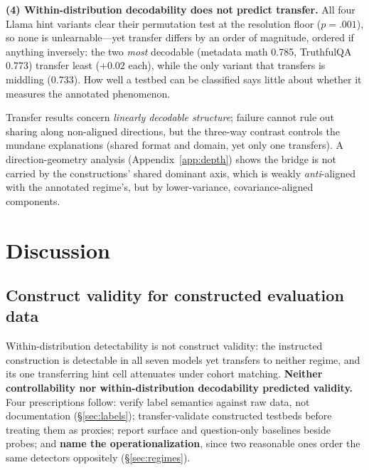 \documentclass[11pt]{article}
\begin{document}
\textbf{(4) Within-distribution decodability does not predict transfer.} All four Llama hint variants clear their permutation test at the resolution floor ($p{=}.001$), so none is unlearnable---yet transfer differs by an order of magnitude, ordered if anything inversely: the two \emph{most} decodable (metadata math 0.785, TruthfulQA 0.773) transfer least ($+0.02$ each), while the only variant that transfers is middling (0.733). How well a testbed can be classified says little about whether it measures the annotated phenomenon.

Transfer results concern \emph{linearly decodable structure}; failure cannot rule out sharing along non-aligned directions, but the three-way contrast controls the mundane explanations (shared format and domain, yet only one transfers). A direction-geometry analysis (Appendix~\ref{app:depth}) shows the bridge is not carried by the constructions' shared dominant axis, which is weakly \emph{anti}-aligned with the annotated regime's, but by lower-variance, covariance-aligned components.

\section{Discussion}
\label{sec:discussion}

\subsection{Construct validity for constructed evaluation data}
Within-distribution detectability is not construct validity: the instructed construction is detectable in all seven models yet transfers to neither regime, and its one transferring hint cell attenuates under cohort matching. \textbf{Neither controllability nor within-distribution decodability predicted validity.} Four prescriptions follow: verify label semantics against raw data, not documentation (\S\ref{sec:labels}); transfer-validate constructed testbeds before treating them as proxies; report surface and question-only baselines beside probes; and \textbf{name the operationalization}, since two reasonable ones order the same detectors oppositely (\S\ref{sec:regimes}).
\end{document}
